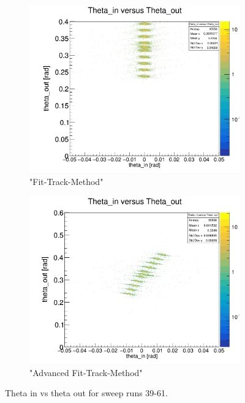 \documentclass[12pt, letterpaper]{article}
\begin{document}
\begin{figure}[!htbp]
\begin{subfigure}{.5\textwidth}
  \label{fig:sub-second}
\end{subfigure}
\begin{subfigure}{.5\textwidth}
  \centering
  \includegraphics[width=.9\linewidth]{plot_imgs/theta_in_theta_out_fit.png} 
  \caption{"Fit-Track-Method"}
  \label{fig:sub-second}
\end{subfigure}
\begin{subfigure}{.5\textwidth}
  \centering
  \includegraphics[width=.9\linewidth]{plot_imgs/theta_in_theta_out_last.png} 
  \caption{"Advanced Fit-Track-Method"}
  \label{fig:sub-second}
\end{subfigure}
\caption{Theta \textunderscore in vs theta \textunderscore out for sweep runs 39-61.}
\label{fig:fig}
\end{figure}
\FloatBarrier
\clearpage
\end{document}
